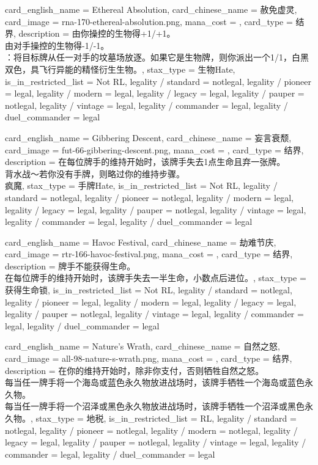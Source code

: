 \documentclass[lang = cn, color = black, 10pt]{AllThatStax}
\begin{document}
\card
{
	card_english_name = {Ethereal Absolution},
	card_chinese_name = {赦免虚灵},
	card_image = rna-170-ethereal-absolution.png,
	mana_cost = ,
	card_type = 结界,
	description = {由你操控的生物得+1/+1。\\
由对手操控的生物得-1/-1。\\
：将目标牌从任一对手的坟墓场放逐。如果它是生物牌，则你派出一个1/1，白黑双色，具飞行异能的精怪衍生生物。},
	stax_type = 生物Hate,
	is_in_restricted_list = Not RL,
	legality / standard = notlegal,
	legality / pioneer = legal,
	legality / modern = legal,
	legality / legacy = legal,
	legality / pauper = notlegal,
	legality / vintage = legal,
	legality / commander = legal,
	legality / duel_commander = legal
}

\card
{
	card_english_name = {Gibbering Descent},
	card_chinese_name = {妄言衰颓},
	card_image = fut-66-gibbering-descent.png,
	mana_cost = ,
	card_type = 结界,
	description = {在每位牌手的维持开始时，该牌手失去1点生命且弃一张牌。\\
背水战～若你没有手牌，则略过你的维持步骤。\\
疯魔},
	stax_type = 手牌Hate,
	is_in_restricted_list = Not RL,
	legality / standard = notlegal,
	legality / pioneer = notlegal,
	legality / modern = legal,
	legality / legacy = legal,
	legality / pauper = notlegal,
	legality / vintage = legal,
	legality / commander = legal,
	legality / duel_commander = legal
}

\card
{
	card_english_name = {Havoc Festival},
	card_chinese_name = {劫难节庆},
	card_image = rtr-166-havoc-festival.png,
	mana_cost = ,
	card_type = 结界,
	description = {牌手不能获得生命。\\
在每位牌手的维持开始时，该牌手失去一半生命，小数点后进位。},
	stax_type = 获得生命锁,
	is_in_restricted_list = Not RL,
	legality / standard = notlegal,
	legality / pioneer = legal,
	legality / modern = legal,
	legality / legacy = legal,
	legality / pauper = notlegal,
	legality / vintage = legal,
	legality / commander = legal,
	legality / duel_commander = legal
}

\card
{
	card_english_name = {Nature's Wrath},
	card_chinese_name = {自然之怒},
	card_image = all-98-nature-s-wrath.png,
	mana_cost = ,
	card_type = 结界,
	description = {在你的维持开始时，除非你支付，否则牺牲自然之怒。\\
每当任一牌手将一个海岛或蓝色永久物放进战场时，该牌手牺牲一个海岛或蓝色永久物。\\
每当任一牌手将一个沼泽或黑色永久物放进战场时，该牌手牺牲一个沼泽或黑色永久物。},
	stax_type = 地税,
	is_in_restricted_list = RL,
	legality / standard = notlegal,
	legality / pioneer = notlegal,
	legality / modern = notlegal,
	legality / legacy = legal,
	legality / pauper = notlegal,
	legality / vintage = legal,
	legality / commander = legal,
	legality / duel_commander = legal
}
\end{document}
